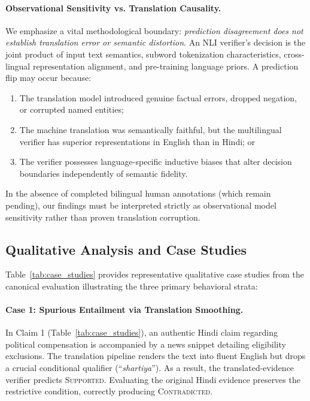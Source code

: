 \paragraph{Observational Sensitivity vs. Translation Causality.}
We emphasize a vital methodological boundary: \emph{prediction disagreement does not establish translation error or semantic distortion}. An NLI verifier's decision is the joint product of input text semantics, subword tokenization characteristics, cross-lingual representation alignment, and pre-training language priors. A prediction flip may occur because:
\begin{enumerate}
    \item The translation model introduced genuine factual errors, dropped negation, or corrupted named entities;
    \item The machine translation was semantically faithful, but the multilingual verifier has superior representations in English than in Hindi; or
    \item The verifier possesses language-specific inductive biases that alter decision boundaries independently of semantic fidelity.
\end{enumerate}
In the absence of completed bilingual human annotations (which remain pending), our findings must be interpreted strictly as observational model sensitivity rather than proven translation corruption.



\subsection{Qualitative Analysis and Case Studies}
Table~\ref{tab:case_studies} provides representative qualitative case studies from the canonical evaluation illustrating the three primary behavioral strata:

\paragraph{Case 1: Spurious Entailment via Translation Smoothing.}
In Claim 1 (Table~\ref{tab:case_studies}), an authentic Hindi claim regarding political compensation is accompanied by a news snippet detailing eligibility exclusions. The translation pipeline renders the text into fluent English but drops a crucial conditional qualifier (``\emph{shartiya}''). As a result, the translated-evidence verifier predicts \textsc{Supported}. Evaluating the original Hindi evidence preserves the restrictive condition, correctly producing \textsc{Contradicted}.


